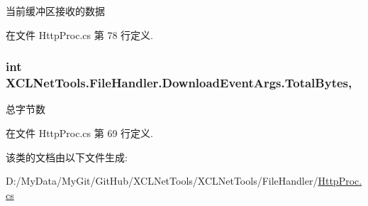 当前缓冲区接收的数据 



在文件 Http\-Proc.\-cs 第 78 行定义.

\hypertarget{class_x_c_l_net_tools_1_1_file_handler_1_1_download_event_args_a344cbcca5a213a50ecd25b90340be816}{
\subsubsection[{Total\-Bytes}]{\setlength{\rightskip}{0pt plus 5cm}int X\-C\-L\-Net\-Tools.\-File\-Handler.\-Download\-Event\-Args.\-Total\-Bytes\hspace{0.3cm}{\ttfamily [get]}, {\ttfamily [set]}}}\label{class_x_c_l_net_tools_1_1_file_handler_1_1_download_event_args_a344cbcca5a213a50ecd25b90340be816}


总字节数 



在文件 Http\-Proc.\-cs 第 69 行定义.



该类的文档由以下文件生成\-:\begin{DoxyCompactItemize}
\item 
D\-:/\-My\-Data/\-My\-Git/\-Git\-Hub/\-X\-C\-L\-Net\-Tools/\-X\-C\-L\-Net\-Tools/\-File\-Handler/\hyperlink{_http_proc_8cs}{Http\-Proc.\-cs}\end{DoxyCompactItemize}
